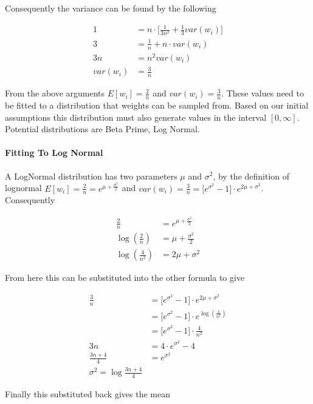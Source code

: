 Consequently the variance can be found by the following

\begin{align*}
	1 &= n \cdot \big[\frac{1}{3 n^2} + \frac{1}{3}var(w_i)\big]\\
	3 &= \frac{1}{n} + n \cdot var(w_i)\\
	3n &= n^2 var(w_i)\\
	var(w_i) &= \frac{3}{n}
\end{align*}

From the above arguments $E[w_i] = \frac{2}{n}$ and $var(w_i) = \frac{3}{n}$. These values need to be fitted to a distribution that weights can be sampled from. Based on our initial assumptions this distribution must also generate values in the interval $[0, \infty]$. Potential distributions are  Beta Prime, Log Normal.

\paragraph{Fitting To Log Normal}

A LogNormal distribution has two parameters $\mu$ and $\sigma^2$, by the definition of lognormal $E[w_i] = \frac{2}{n} = e^{\mu + \frac{\sigma^2}{2}}$ and $var(w_i) = \frac{3}{n} = \big[e^{\sigma^2} - 1\big] \cdot e^{2\mu + \sigma^2}$. Consequently

\begin{align*}
	\frac{2}{n} &= e^{\mu + \frac{\sigma^2}{2}}\\
	\log(\frac{2}{n}) &= \mu + \frac{\sigma^2}{2}\\
	\log(\frac{4}{n^2}) &= 2\mu + \sigma^2
\end{align*}

From here this can be substituted into the other formula to give

\begin{align*}
	\frac{3}{n} &= \big[e^{\sigma^2} - 1\big] \cdot e^{2\mu + \sigma^2}\\
	&= \big[e^{\sigma^2} - 1\big] \cdot e^{\log(\frac{4}{n^2})}\\
	&= \big[e^{\sigma^2} - 1\big] \cdot \frac{4}{n^2}\\
	3n &= 4 \cdot e^{\sigma^2} - 4\\
	\frac{3n + 4}{4} &= e^{\sigma^2}\\
	\sigma^2 = \log \frac{3n + 4}{4}
\end{align*}

Finally this substituted back gives the mean

